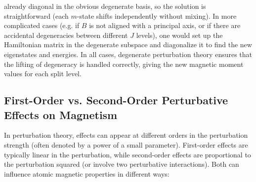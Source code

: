 \documentclass[12pt]{article}
\begin{document}
already diagonal in the obvious degenerate basis, so the solution is straightforward (each $m$-state shifts independently without mixing). In more complicated cases (e.g. if $B$ is not aligned with a principal axis, or if there are accidental degeneracies between different $J$ levels), one would set up the Hamiltonian matrix in the degenerate subspace and diagonalize it to find the new eigenstates and energies. In all cases, degenerate perturbation theory ensures that the lifting of degeneracy is handled correctly, giving the new magnetic moment values for each split level.

    \subsection{First-Order vs. Second-Order Perturbative Effects on Magnetism}
        In perturbation theory, effects can appear at different orders in the perturbation strength (often denoted by a power of a small parameter). First-order effects are typically linear in the perturbation, while second-order effects are proportional to the perturbation squared (or involve two perturbative interactions). Both can influence atomic magnetic properties in different ways:
\end{document}
